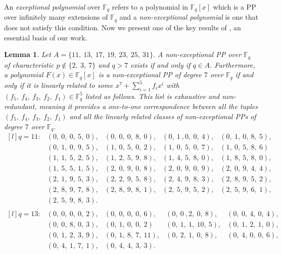 \documentclass[12pt,a4wide, reqno]{amsart}
\newtheorem{lemma}{Lemma}
\theoremstyle{definition}
\theoremstyle{remark}
\numberwithin{equation}{section}
\begin{document}
An \textit{exceptional polynomial} over $\mathbb{F}_q$ refers to a polynomial in $\mathbb{F}_q[x]$ which is a PP over infinitely many extensions of $\mathbb{F}_q$ and a \textit{non-exceptional polynomial} is one that does not satisfy this condition.
Now we present one of the key results of \cite{xfan}, an essential basis of our work.
\begin{lemma}\cite[Theorem~13]{xfan}\label{l4}
    Let $A=\{11,~13,~17,~19,~23,~25,~31\}.$ A non-exceptional PP over $\mathbb{F}_q$ of characteristic $p\notin\{2,~3,~7\}$ and $q>7$ exists if and only if $q\in A.$ Furthermore, a polynomial $F(x)\in\mathbb{F}_q[x]$ is a non-exceptional PP of degree $7$ over $\mathbb{F}_q$ if and only if it is linearly related to some $x^7+\sum_{i=1}^{5}f_ix^i$ with $(f_5,~f_4,~f_3,~f_2,~f_1)\in \mathbb{F}_q^5$ listed as follows. This list is exhaustive and non-redundant, meaning it provides a one-to-one correspondence between all the tuples $(f_5,~f_4,~f_3,~f_2,~f_1)$ and all the linearly related classes of non-exceptional PPs of degree $7$ over $\mathbb{F}_q.$
   \begin{displaymath}
 \begin{matrix*}[l]
 q=11:&(0,~0,~0,~5,~0),&(0,~0,~0,~8,~0),& (0,~1~,0,~0,~4),&(0,~1,~0,~8,~5), \\
 &(0,~1,~0,~9,~5),& (1,~0,~5,~0,~2),&(1,~0,~5,~0,~7),&(1,~0,~5,~8,~6)\\
 &(1,~1,~5,~2,~5),&(1,~2,~5,~9,~8),& (1,~4,~5,~8,~0),&(1,~8,~5,~8,~0),\\
 &(1,~5,~5,~1,~5),&(2,~0,~9,~0,~8),& (2,~0,~9,~0,~9),& (2,~0,~9,~4,~4),\\
 &(2,~1,~9,~5,~3),& (2,~2,~9,~5,~8),&(2,~4,~9,~8,~3),&(2,~8,~9,~5,~2), \\
&(2,~8,~9,~7,~8),&(2,~8,~9,~8,~1), &(2,~5,~9,~5,~2),& (2,~5,~9,~6,~1),\\
&(2,~5,~9,~8,~3).& & & \\
\end{matrix*}
\end{displaymath}
\begin{displaymath}
\begin{matrix*}[l]
q=13:& (0,~0,~0,~0,~2), &(0,~0,~0,~0,~6), & (0,~0~,2,~0,~8),&(0,~0,~4,~0,~4),\\ & (0,~0,~8,~0,~3),& (0,~1,~0,~0,~2) &(0,~1,~1,~10,~5),&(0,~1,~2,~1,~0),\\
& (0,~1,~2,~3,~9), &(0,~1,~8,~7,~11),& (0,~2,~1,~0,~8), &(0,~4,~0,~0,~6),\\
& (0,~4,~1,~7,~1), &(0,~4,~4,~3,~3). & &  \\

\end{matrix*}
\end{displaymath}
\end{lemma}
\end{document}
